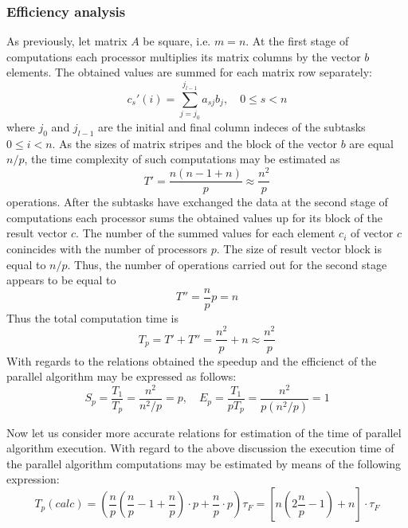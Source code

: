 \subsubsection{Efficiency analysis} %
\label{ssub:efficienct_analysis}
As previously, let matrix $A$ be square, i.e. $m=n$. At the first stage of computations each processor multiplies its matrix columns by the vector $b$ elements. The obtained values are summed for each matrix row separately:
\begin{equation}
  c_s'(i) = \sum_{j=j_0}^{j_{l-1}} a_{sj}b_j, \quad 0\leq s < n
\end{equation}
where $j_0$ and $j_{l-1}$ are the initial and final column indeces of the subtasks $0\leq i <n$. As the sizes of matrix stripes and the block of the vector $b$ are equal $n/p$, the time complexity of such computations may be estimated as
\begin{equation}
  T' = \frac{n(n-1+n)}{p} \approx \frac{n^2}{p}
\end{equation}
operations. After the subtasks have exchanged the data at the second stage of computations each processor sums the obtained values up for its block of the result vector $c$. The number of the summed values for each element $c_i$ of vector $c$ conincides with the number of processors $p$. The size of result vector block is equal to $n/p$. Thus, the number of operations carried out for the second stage appears to be equal to
\begin{equation}
  T'' = \frac{n}{p} p = n
\end{equation}
Thus the total computation time is
\begin{equation}
  T_p = T' + T'' = \frac{n^2}{p} + n \approx \frac{n^2}{p}
\end{equation}
With regards to the relations obtained the speedup and the efficienct of the parallel algorithm may be expressed as follows:
\begin{equation}
  S_p = \frac{T_1}{T_p} = \frac{n^2}{n^2/p} = p, \quad E_p = \frac{T_1}{pT_p} = \frac{n^2}{p(n^2/p)} = 1
\end{equation}

Now let us consider more accurate relations for estimation of the time of parallel algorithm execution. With
regard to the above discussion the execution time of the parallel algorithm computations may be estimated by means
of the following expression:
\begin{equation}
  T_p (calc) = (\frac{n}{p}(\frac{n}{p} - 1 + \frac{n}{p}) \cdot p + \frac{n}{p} \cdot p )\tau_F
   = \left[ n (2 \frac{n}{p} -1  ) + n \right] \cdot \tau_F
\end{equation}








